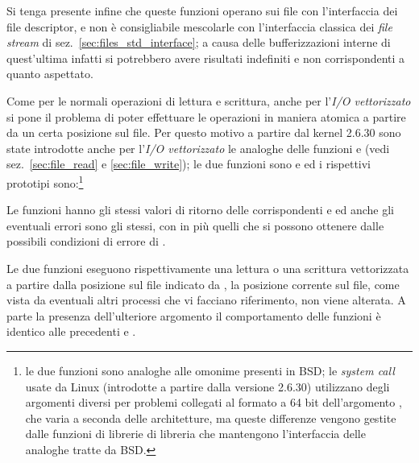 Si tenga presente infine che queste funzioni operano sui file con
l'interfaccia dei file descriptor, e non è consigliabile mescolarle con
l'interfaccia classica dei \textit{file stream} di
sez.~\ref{sec:files_std_interface}; a causa delle bufferizzazioni interne di
quest'ultima infatti si potrebbero avere risultati indefiniti e non
corrispondenti a quanto aspettato.

Come per le normali operazioni di lettura e scrittura, anche per l'\textsl{I/O
  vettorizzato} si pone il problema di poter effettuare le operazioni in
maniera atomica a partire da un certa posizione sul file. Per questo motivo a
partire dal kernel 2.6.30 sono state introdotte anche per l'\textsl{I/O
  vettorizzato} le analoghe delle funzioni  e  (vedi
sez.~\ref{sec:file_read} e \ref{sec:file_write}); le due funzioni sono
 e  ed i rispettivi prototipi sono:\footnote{le
  due funzioni sono analoghe alle omonime presenti in BSD; le \textit{system
    call} usate da Linux (introdotte a partire dalla versione 2.6.30)
  utilizzano degli argomenti diversi per problemi collegati al formato a 64
  bit dell'argomento , che varia a seconda delle architetture,
  ma queste differenze vengono gestite dalle funzioni di librerie di libreria
  che mantengono l'interfaccia delle analoghe tratte da BSD.}


\begin{funcproto}{
}

{ Le funzioni hanno gli stessi valori di ritorno delle corrispondenti
   e  ed anche gli eventuali errori sono gli stessi,
  con in più quelli che si possono ottenere dalle possibili condizioni di
  errore di .
}
\end{funcproto}

Le due funzioni eseguono rispettivamente una lettura o una scrittura
vettorizzata a partire dalla posizione  sul file indicato
da , la posizione corrente sul file, come vista da eventuali altri
processi che vi facciano riferimento, non viene alterata. A parte la presenza
dell'ulteriore argomento il comportamento delle funzioni è identico alle
precedenti  e . 

